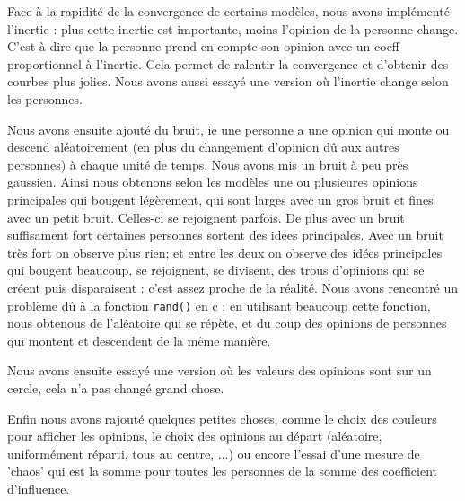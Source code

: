 \documentclass[a4paper,10pt]{article}
\begin{document}
Face à la rapidité de la convergence de certains modèles, nous avons implémenté l'inertie : plus cette inertie est importante, moins l'opinion de la personne change. C'est à dire que la personne prend en compte son opinion avec un coeff proportionnel à l'inertie. Cela permet de ralentir la convergence et d'obtenir des courbes plus jolies.
Nous avons aussi essayé une version où l'inertie change selon les personnes.

Nous avons ensuite ajouté du bruit, ie une personne a une opinion qui monte ou descend aléatoirement (en plus du changement d'opinion dû aux autres personnes) à chaque unité de temps. Nous avons mis un bruit à peu près gaussien. Ainsi nous obtenons selon les modèles une ou plusieures opinions principales qui bougent légèrement, qui sont larges avec un gros bruit et fines avec un petit bruit. Celles-ci se rejoignent parfois. De plus avec un bruit suffisament fort certaines personnes sortent des idées principales. Avec un bruit très fort on observe plus rien; et entre les deux on observe des idées principales qui bougent beaucoup, se rejoignent, se divisent, des trous d'opinions qui se créent puis disparaisent : c'est assez proche de la réalité.
Nous avons rencontré un problème dû à la fonction \texttt{rand()} en c : en utilisant beaucoup cette fonction, nous obtenous de l'aléatoire qui se répète, et du coup des opinions de personnes qui montent et descendent de la même manière.

Nous avons ensuite essayé une version où les valeurs des opinions sont sur un cercle, cela n'a pas changé grand chose.

Enfin nous avons rajouté quelques petites choses, comme le choix des couleurs pour afficher les opinions, le choix des opinions au départ (aléatoire, uniformément réparti, tous au centre, ...) ou encore l'essai d'une mesure de 'chaos' qui est la somme pour toutes les personnes de la somme des coefficient d'influence.
\end{document}
